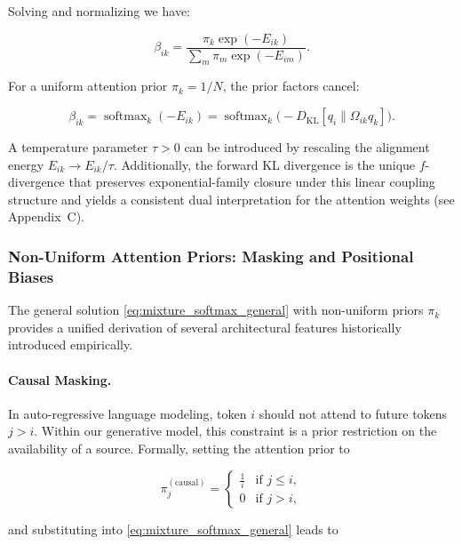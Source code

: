 \documentclass[twoside,11pt]{article}
\begin{document}
Solving and normalizing we have:

\begin{equation}
\beta_{ik} = \frac{\pi_k \exp(-E_{ik})}{\sum_m \pi_m \exp(-E_{im})}.
\label{eq:mixture_softmax_general}
\end{equation}

For a uniform attention prior $\pi_k = 1/N$, the prior factors cancel:

\begin{equation}
\boxed{\beta_{ik} = \operatorname{softmax}_k(-E_{ik}) = \operatorname{softmax}_k\!\big(-D_{\mathrm{KL}}[q_i \| \Omega_{ik} q_k]\big).}
\label{eq:mixture_softmax}
\end{equation}

A temperature parameter $\tau > 0$ can be introduced by rescaling the alignment energy $E_{ik} \to E_{ik}/\tau$. Additionally, the forward KL divergence is the unique $f$-divergence that preserves exponential-family closure under this linear coupling structure and yields a consistent dual interpretation for the attention weights (see Appendix~C).

\subsubsection{Non-Uniform Attention Priors: Masking and Positional Biases}
\label{sec:nonuniform_priors}

The general solution \eqref{eq:mixture_softmax_general} with non-uniform priors $\pi_k$ provides a unified derivation of several architectural features historically introduced empirically. 

\paragraph{Causal Masking.}
In auto-regressive language modeling, token $i$ should not attend to future tokens $j > i$. Within our generative model, this constraint is a prior restriction on the availability of a source. Formally, setting the attention prior to

\begin{equation}
\pi_j^{(\text{causal})} = \begin{cases} \frac{1}{i} & \text{if } j \leq i, \\ 0 & \text{if } j > i, \end{cases}
\label{eq:causal_prior}
\end{equation}

and substituting into \eqref{eq:mixture_softmax_general} leads to
\end{document}
